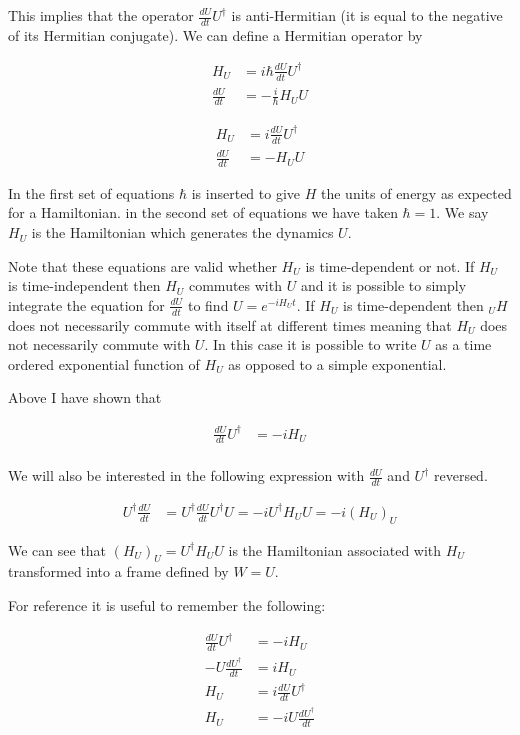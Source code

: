 \documentclass[12pt]{article}
\newcommand{\ddt}[1]{\frac{d #1}{dt}}
\begin{document}
This implies that the operator $\ddt{U} U^{\dag}$ is anti-Hermitian (it is equal to the negative of its Hermitian conjugate). We can define a Hermitian operator by

\begin{align}
H_U &= i \hbar \ddt{U}U^{\dag}\\
\ddt{U} &= -\frac{i}{\hbar} H_U U
\end{align}

\begin{align}
H_U &= i \ddt{U}U^{\dag}\\
\ddt{U} &= - H_U U
\end{align}

In the first set of equations $\hbar$ is inserted to give $H$ the units of energy as expected for a Hamiltonian. in the second set of equations we have taken $\hbar = 1$. We say $H_U$ is the Hamiltonian which generates the dynamics $U$.

Note that these equations are valid whether $H_U$ is time-dependent or not. If $H_U$ is time-independent then $H_U$ commutes with $U$ and it is possible to simply integrate the equation for $\ddt{U}$ to find $U=e^{-iH_Ut}$. If $H_U$ is time-dependent then $_UH$ does not necessarily commute with itself at different times meaning that $H_U$ does not necessarily commute with $U$. In this case it is possible to write $U$ as a time ordered exponential function of $H_U$ as opposed to a simple exponential. 

Above I have shown that

\begin{align}
\ddt{U}U^{\dag} &= -iH_U\\
\end{align}

We will also be interested in the following expression with $\ddt{U}$ and $U^{\dag}$ reversed.

\begin{align}
U^{\dag}\ddt{U} &= U^{\dag}\ddt{U} U^{\dag} U = -iU^{\dag} H_U U = -i(H_U)_U
\end{align}

We can see that $(H_U)_U = U^{\dag} H_U U$ is the Hamiltonian associated with $H_U$ transformed into a frame defined by $W=U$.

For reference it is useful to remember the following:

\begin{align}
\ddt{U}U^{\dag} &= -iH_U\\
-U\ddt{U^{\dag}} &= iH_U\\
H_U &= i \ddt{U}U^{\dag}\\
H_U &= -iU\ddt{U^{\dag}}
\end{align}
\end{document}
